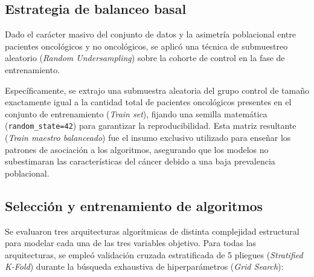 \subsection{Estrategia de balanceo basal}
Dado el carácter masivo del conjunto de datos y la asimetría poblacional entre pacientes oncológicos y no oncológicos, se aplicó una técnica de submuestreo aleatorio (\textit{Random Undersampling}) sobre la cohorte de control en la fase de entrenamiento. 

Específicamente, se extrajo una submuestra aleatoria del grupo control de tamaño exactamente igual a la cantidad total de pacientes oncológicos presentes en el conjunto de entrenamiento (\textit{Train set}), fijando una semilla matemática (\texttt{random\_state=42}) para garantizar la reproducibilidad. Esta matriz resultante (\textit{Train maestro balanceado}) fue el insumo exclusivo utilizado para enseñar los patrones de asociación a los algoritmos, asegurando que los modelos no subestimaran las características del cáncer debido a una baja prevalencia poblacional.

\subsection{Selección y entrenamiento de algoritmos}
Se evaluaron tres arquitecturas algorítmicas de distinta complejidad estructural para modelar cada una de las tres variables objetivo. Para todas las arquitecturas, se empleó validación cruzada estratificada de 5 pliegues (\textit{Stratified K-Fold}) durante la búsqueda exhaustiva de hiperparámetros (\textit{Grid Search}):

